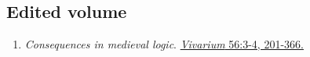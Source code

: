 \subsection{Edited volume}
\begin{enumerate}
	\item {}
	{}
	{
		\emph{Consequences in medieval logic}. 		\href{https://brill.com/view/journals/viv/56/3-4/viv.56.issue-3-4.xml?language=en}{\emph{Vivarium} 56:3-4, 201-366.}}
	{}
	\setcounter{publicationCounter}{\value{enumi}}	%
\end{enumerate}
